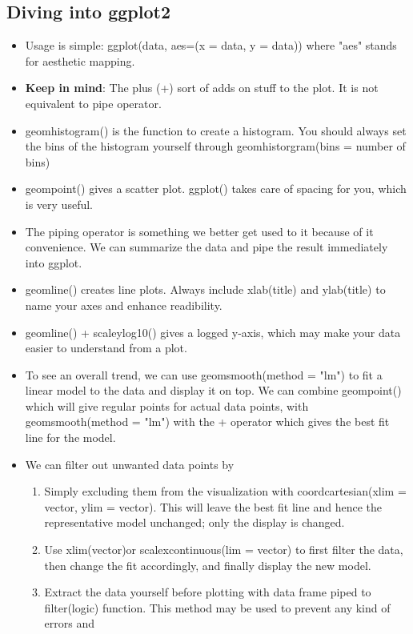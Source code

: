\subsection{Diving into ggplot2}
\begin{itemize}
    \item Usage is simple: ggplot(data, aes=(x = data, y = data)) where "aes" stands for
    aesthetic mapping.
    \item \textbf{Keep in mind}: The plus (+) sort of adds on stuff to the plot. It is not
    equivalent to pipe operator.
    \item geomhistogram() is the function to create a histogram. You should always set the
    bins of the histogram yourself through geomhistorgram(bins = number of bins)
    \item geompoint() gives a scatter plot. ggplot() takes care of spacing for you, which
    is very useful. 
    \item The piping operator is something we better get used to it because of it
    convenience. We can summarize the data and pipe the result immediately into ggplot. 
    \item geomline() creates line plots. Always include xlab(title) and ylab(title) to
    name your axes and enhance readibility. 
    \item geomline() + scaleylog10() gives a logged y-axis, which may make your data
    easier to understand from a plot. 
    \item To see an overall trend, we can use geomsmooth(method = "lm") to fit a linear
    model to the data and display it on top. We can combine geompoint() which will give
    regular points for actual data points, with geomsmooth(method = "lm") with the +
    operator which gives the best fit line for the model.
    \item We can filter out unwanted data points by
    \begin{enumerate}
        \item Simply excluding them from the visualization with coordcartesian(xlim =
        vector, ylim = vector). This will leave the best fit line and hence the
        representative model unchanged; only the display is changed.
        \item Use xlim(vector)or scalexcontinuous(lim = vector) to first filter the data,
        then change the fit accordingly, and finally display the new model.
        \item Extract the data yourself before plotting with data frame piped to
        filter(logic) function. This method may be used to prevent any kind of errors and

\end{enumerate}
\end{itemize}
